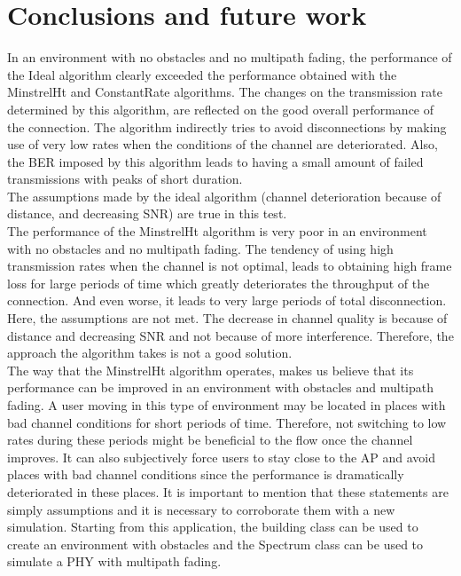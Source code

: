 \documentclass[12]{article}
\begin{document}
\newpage
\section{Conclusions and future work}
In an environment with no obstacles and no multipath fading, the performance of the Ideal algorithm clearly exceeded the performance obtained with the MinstrelHt and ConstantRate algorithms. The changes on the transmission rate determined by this algorithm, are reflected on the good overall performance of the connection. The algorithm indirectly tries to avoid disconnections by making use of very low rates when the conditions of the channel are deteriorated. Also, the BER imposed by this algorithm leads to having a small amount of failed transmissions with peaks of short duration.\\
The assumptions made by the ideal algorithm (channel deterioration because of distance, and decreasing SNR) are true in this test.\\

The performance of the MinstrelHt algorithm is very poor in an environment with no obstacles and no multipath fading. The tendency of using high transmission rates when the channel is not optimal, leads to obtaining high frame loss for large periods of time which greatly deteriorates the throughput of the connection. And even worse, it leads to very large periods of total disconnection.\\
Here, the assumptions are not met. The decrease in channel quality is because of distance and decreasing SNR and not because of more interference. Therefore, the approach the algorithm takes is not a good solution.\\

The way that the MinstrelHt algorithm operates, makes us believe that its performance can be improved in an environment with obstacles and multipath fading. A user moving in this type of environment may be located in places with bad channel conditions for short periods of time. Therefore, not switching to low rates during these periods might be beneficial to the flow once the channel improves. It can also subjectively force users to stay close to the AP and avoid places with bad channel conditions since the performance is dramatically deteriorated in these places. It is important to mention that these statements are simply assumptions and it is necessary to corroborate them with a new simulation. Starting from this application, the building class can be used to create an environment with obstacles and the Spectrum class can be used to simulate a PHY with multipath fading.




\end{document}
